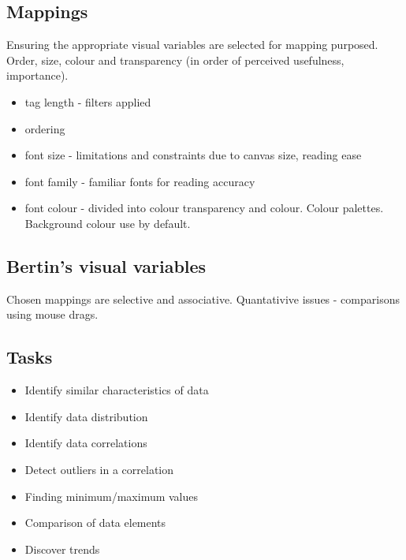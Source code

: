 \subsection{Mappings}

Ensuring the appropriate visual variables are selected for mapping purposed. Order, size, colour and transparency (in order of perceived usefulness, importance).


\begin{itemize}
\item tag length - filters applied
\item ordering
\item font size - limitations and constraints due to canvas size, reading ease
\item font family - familiar fonts for reading accuracy
\item font colour - divided into colour transparency and colour. Colour palettes. Background colour use by default.
\end{itemize}

\subsection{Bertin's visual variables}

Chosen mappings are selective and associative. Quantativive issues - comparisons using mouse drags.

\subsection{Tasks}

\begin{itemize}
\item Identify similar characteristics of data 
\item Identify data distribution 
\item Identify data correlations 
\item Detect outliers in a correlation
\item Finding minimum/maximum values
\item Comparison of data elements  
\item Discover trends 
\end{itemize}




